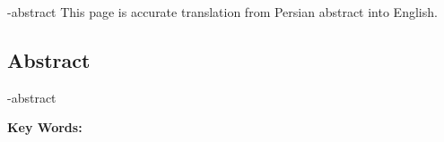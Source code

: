 
\en-abstract{
This page is accurate translation from Persian abstract into English.
}

\newpage
\thispagestyle{empty}
\begin{latin}
\section*{\LARGE\centering Abstract}

\een-abstract

\vspace*{.5cm}
{\large\textbf{Key Words:}}\par
\vspace*{.5cm}
\elatinkeywords
\end{latin}
